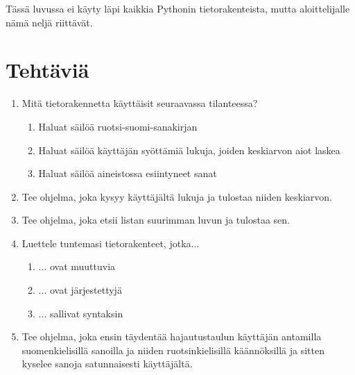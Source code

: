Tässä luvussa ei käyty läpi kaikkia Pythonin tietorakenteista, mutta aloittelijalle nämä neljä riittävät.

\section{Tehtäviä}

\begin{enumerate}[\thesection .1]

\item Mitä tietorakennetta käyttäisit seuraavassa tilanteessa?

\begin{enumerate}
\item Haluat säilöä ruotsi-suomi-sanakirjan
\item Haluat säilöä käyttäjän syöttämiä lukuja, joiden keskiarvon aiot laskea
\item Haluat säilöä aineistossa esiintyneet sanat
\end{enumerate}

\item Tee ohjelma, joka kysyy käyttäjältä lukuja ja tulostaa niiden keskiarvon.

\item Tee ohjelma, joka etsii listan suurimman luvun ja tulostaa sen.

\item Luettele tuntemasi tietorakenteet, jotka...

\begin{enumerate}
\item ... ovat muuttuvia
\item ... ovat järjestettyjä
\item ... sallivat syntaksin 
\end{enumerate}

\item Tee ohjelma, joka ensin täydentää hajautustaulun käyttäjän antamilla suomenkielisillä sanoilla ja niiden ruotsinkielisillä käännöksillä ja sitten kyselee sanoja satunnaisesti käyttäjältä.

\end{enumerate}
